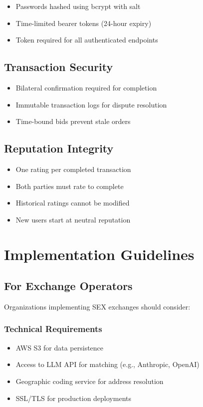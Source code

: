 \documentclass[11pt,a4paper]{article}
\begin{document}
\begin{itemize}
    \item Passwords hashed using bcrypt with salt
    \item Time-limited bearer tokens (24-hour expiry)
    \item Token required for all authenticated endpoints
\end{itemize}

\subsection{Transaction Security}

\begin{itemize}
    \item Bilateral confirmation required for completion
    \item Immutable transaction logs for dispute resolution
    \item Time-bound bids prevent stale orders
\end{itemize}

\subsection{Reputation Integrity}

\begin{itemize}
    \item One rating per completed transaction
    \item Both parties must rate to complete
    \item Historical ratings cannot be modified
    \item New users start at neutral reputation
\end{itemize}

\section{Implementation Guidelines}

\subsection{For Exchange Operators}

Organizations implementing SEX exchanges should consider:

\subsubsection{Technical Requirements}
\begin{itemize}
    \item AWS S3 for data persistence
    \item Access to LLM API for matching (e.g., Anthropic, OpenAI)
    \item Geographic coding service for address resolution
    \item SSL/TLS for production deployments
\end{itemize}
\end{document}
